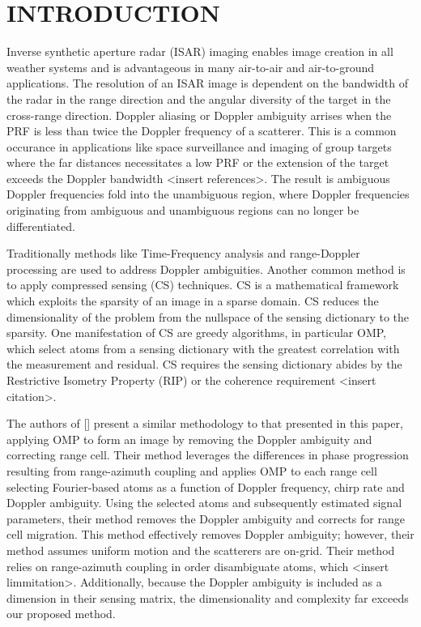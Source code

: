 \documentclass[]{spie}  %
\begin{document}
\section{INTRODUCTION}
\label{sec:intro}  %

Inverse synthetic aperture radar (ISAR) imaging enables image creation in all weather systems and is advantageous in many air-to-air and air-to-ground applications. The resolution of an ISAR image is dependent on the bandwidth of the radar in the range direction and the angular diversity of the target in the cross-range direction. Doppler aliasing or Doppler ambiguity arrises when the PRF is less than twice the Doppler frequency of a scatterer. This is a common occurance in applications like space surveillance and imaging of group targets where the far distances necessitates a low PRF or the extension of the target exceeds the Doppler bandwidth <insert references>. The result is ambiguous Doppler frequencies fold into the unambiguous region, where Doppler frequencies originating from ambiguous and unambiguous regions can no longer be differentiated. 

Traditionally methods like Time-Frequency analysis and range-Doppler processing are used to address Doppler ambiguities. Another common method is to apply compressed sensing (CS) techniques. CS is a mathematical framework which exploits the sparsity of an image in a sparse domain. CS reduces the dimensionality of the problem from the nullspace of the sensing dictionary to the sparsity. One manifestation of CS are greedy algorithms, in particular OMP, which select atoms from a sensing dictionary with the greatest correlation with the measurement and residual. CS requires the sensing dictionary abides by the Restrictive Isometry Property (RIP) or the coherence requirement <insert citation>. 

The authors of [] present a similar methodology to that presented in this paper, applying OMP to form an image by removing the Doppler ambiguity and correcting range cell. Their method leverages the differences in phase progression resulting from range-azimuth coupling and applies OMP to each range cell selecting Fourier-based atoms as a function of Doppler frequency, chirp rate and Doppler ambiguity. Using the selected atoms and subsequently estimated signal parameters, their method removes the Doppler ambiguity and corrects for range cell migration. This method effectively removes Doppler ambiguity; however, their method assumes uniform motion and the scatterers are on-grid. Their method relies on range-azimuth coupling in order disambiguate atoms, which <insert limmitation>. Additionally, because the Doppler ambiguity is included as a dimension in their sensing matrix, the dimensionality and complexity far exceeds our proposed method.
\end{document}
